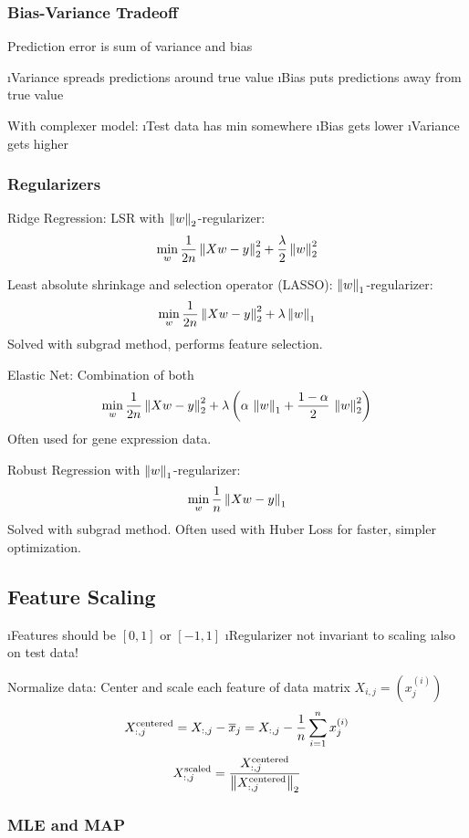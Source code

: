 \subsubsection{Bias-Variance Tradeoff}

Prediction error is sum of variance and bias

\bi
\i Variance spreads predictions around true value
\i Bias puts predictions away from true value
\ei

With complexer model:
\be
\i Test data has min somewhere
\i Bias gets lower
\i Variance gets higher
\ee

\subsubsection{Regularizers}

Ridge Regression: LSR with $\left\lVert w\right\rVert_2$-regularizer:
\[
\min_w \frac{1}{2n} \left\lVert Xw-y\right\rVert_2^2 + \frac{\lambda}{2} \left\lVert w\right\rVert_2^2
\]

Least absolute shrinkage and selection operator (LASSO): $\left\lVert w\right\rVert_1$-regularizer:
\[
\min_w \frac{1}{2n} \left\lVert Xw-y\right\rVert_2^2 + \lambda \left\lVert w\right\rVert_1
\]
Solved with subgrad method, performs feature selection.

Elastic Net: Combination of both
\[
\min_w \frac{1}{2n} \left\lVert Xw-y\right\rVert^2_2 + \lambda \left( \alpha \, \left\lVert w\right\rVert_1 + \frac{1-\alpha}{2}\, \left\lVert w\right\rVert_2^2\right)
\]
Often used for gene expression data.

Robust Regression with $\left\lVert w\right\rVert_1$-regularizer:
\[
\min_w \frac{1}{n} \left\lVert Xw-y\right\rVert_1
\]
Solved with subgrad method. Often used with Huber Loss for faster, simpler optimization.

\subsection{Feature Scaling}

\bi
\i Features should be $[0,1]$ or $[-1,1]$
\i Regularizer not invariant to scaling
\i also on test data!
\ei

\newcommand{\centered}{\text{centered}}
\newcommand{\scaled}{\text{scaled}}
Normalize data: Center and scale each feature of data matrix $X_{i,j} = (x_j^{(i)})$
\[
X_{:,j}^{\centered} = X_{:,j} - \overline x_j = X_{:,j} - \frac{1}{n} \dsumni x_j^{(i)}
\]
\[
X_{:,j}^{\scaled} = \frac{X_{:,j}^{\centered}}{\norm{X_{:,j}^{\centered}}_2}
\]

\subsubsection{MLE and MAP}

